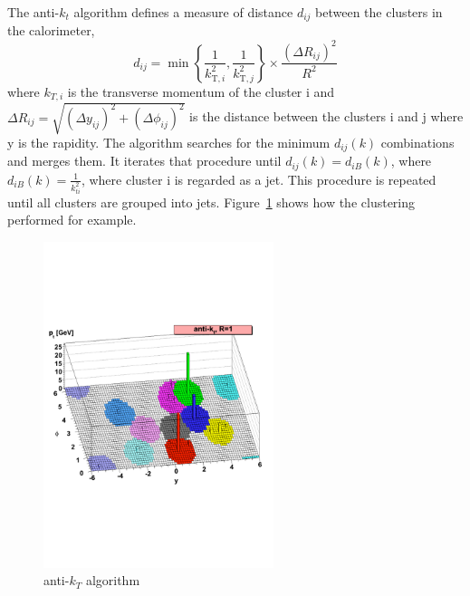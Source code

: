 The anti-$k_t$ algorithm defines a measure of distance $d_{ij}$ between the clusters in the calorimeter,
\begin{equation}
d_{i j}=\min \left\{\frac{1}{k_{\mathrm{T}, i}^{2}}, \frac{1}{k_{\mathrm{T}, j}^{2}}\right\} \times \frac{\left(\Delta R_{i j}\right)^{2}}{R^{2}}
\end{equation}
where $k_{T,i}$ is the transverse momentum of the cluster i and $\Delta R_{i j}=\sqrt{\left(\Delta y_{i j}\right)^{2}+\left(\Delta \phi_{i j}\right)^{2}}$ is the distance between the clusters i and j where y is the rapidity. 
The algorithm searches for the minimum $d_{i j}(k)$ combinations and merges them. 
It iterates that procedure until $d_{i j}(k) = d_{i B}(k)$, where $d_{i B}(k) = \frac{1}{k^2_{ti}}$, where cluster i is regarded as a jet.
This procedure is repeated until all clusters are grouped into jets.
Figure~\ref{fig:antikt} shows how the clustering performed for example.
\begin{figure}[tbp]
\begin{center}
 \includegraphics[width=0.60\textwidth,keepaspectratio]{figures/Reconstruction/antikt}
\caption{
anti-$k_T$ algorithm \cite{Cacciari_2008}
}
\label{fig:antikt}
\end{center}
\end{figure}

